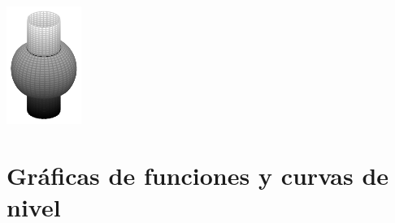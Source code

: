 \begin{example}
{    \includegraphics[width=\linewidth]{Images/Capitulo1/Dominio_de_funcion3d.pdf}
    }
\end{example}

\section{Gráficas de funciones y curvas de nivel}

